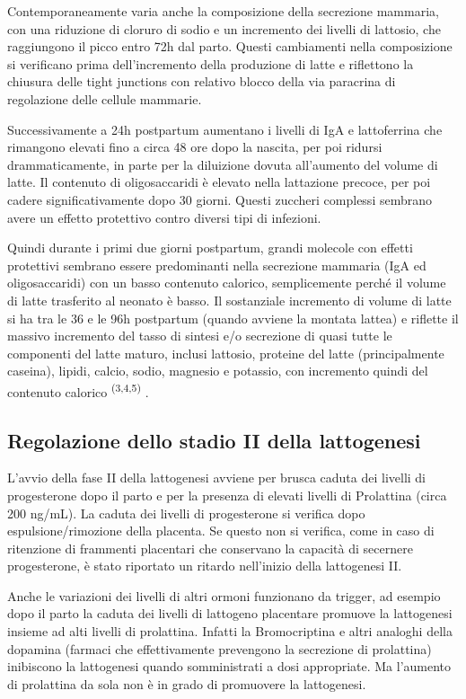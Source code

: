 \documentclass[]{article}
\begin{document}
Contemporaneamente varia anche la composizione della secrezione
mammaria, con una riduzione di cloruro di sodio e un incremento dei
livelli di lattosio, che raggiungono il picco entro 72h dal parto.
Questi cambiamenti nella composizione si verificano prima
dell'incremento della produzione di latte e riflettono la chiusura delle
tight junctions con relativo blocco della via paracrina di regolazione
delle cellule mammarie.

Successivamente a 24h postpartum aumentano i livelli di IgA e
lattoferrina che rimangono elevati fino a circa 48 ore dopo la nascita,
per poi ridursi drammaticamente, in parte per la diluizione dovuta
all'aumento del volume di latte. Il contenuto di oligosaccaridi è
elevato nella lattazione precoce, per poi cadere significativamente dopo
30 giorni. Questi zuccheri complessi sembrano avere un effetto
protettivo contro diversi tipi di infezioni.

Quindi durante i primi due giorni postpartum, grandi molecole con
effetti protettivi sembrano essere predominanti nella secrezione
mammaria (IgA ed oligosaccaridi) con un basso contenuto calorico,
semplicemente perché il volume di latte trasferito al neonato è basso.
Il sostanziale incremento di volume di latte si ha tra le 36 e le 96h
postpartum (quando avviene la montata lattea) e riflette il massivo
incremento del tasso di sintesi e/o secrezione di quasi tutte le
componenti del latte maturo, inclusi lattosio, proteine del latte
(principalmente caseina), lipidi, calcio, sodio, magnesio e potassio,
con incremento quindi del contenuto calorico \textsuperscript{(3,4,5)} .

\hypertarget{regolazione-dello-stadio-ii-della-lattogenesi}{%
\subsection{Regolazione dello stadio II della
lattogenesi}\label{regolazione-dello-stadio-ii-della-lattogenesi}}

L'avvio della fase II della lattogenesi avviene per brusca caduta dei
livelli di progesterone dopo il parto e per la presenza di elevati
livelli di Prolattina (circa 200 ng/mL). La caduta dei livelli di
progesterone si verifica dopo espulsione/rimozione della placenta. Se
questo non si verifica, come in caso di ritenzione di frammenti
placentari che conservano la capacità di secernere progesterone, è stato
riportato un ritardo nell'inizio della lattogenesi II.

Anche le variazioni dei livelli di altri ormoni funzionano da trigger,
ad esempio dopo il parto la caduta dei livelli di lattogeno placentare
promuove la lattogenesi insieme ad alti livelli di prolattina. Infatti
la Bromocriptina e altri analoghi della dopamina (farmaci che
effettivamente prevengono la secrezione di prolattina) inibiscono la
lattogenesi quando somministrati a dosi appropriate. Ma l'aumento di
prolattina da sola non è in grado di promuovere la lattogenesi.
\end{document}

